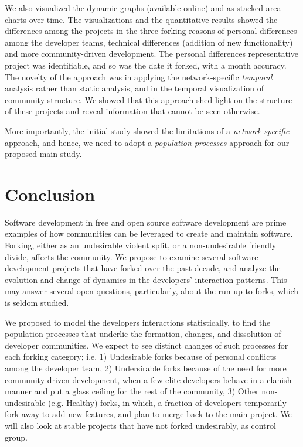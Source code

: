 \documentclass{acm_proc_article-sp}
\begin{document}
We also visualized the dynamic graphs (available online) and as stacked area charts over time. The visualizations and the quantitative results showed the differences among the projects in the three forking reasons of personal differences among the developer teams, technical differences (addition of new functionality) and more community-driven development. The personal differences representative project was identifiable, and so was the date it forked, with a month accuracy. The novelty of the approach was in applying the network-specific \textit{temporal} analysis rather than static analysis, and in the temporal visualization of community structure. We showed that this approach shed light on the structure of these projects and reveal information that cannot be seen otherwise.

More importantly, the initial study showed the limitations of a \textit{network-specific} approach, and hence, we need to adopt a \textit{population-processes} approach for our proposed main study.

\section{Conclusion}
Software development in free and open source software development are prime examples of how communities can be leveraged to create and maintain software. Forking, either as an undesirable violent split, or a non-undesirable friendly divide, affects the community. We propose to examine several software development projects that have forked over the past decade, and analyze the evolution and change of dynamics in the developers' interaction patterns. This may answer several open questions, particularly, about the run-up to forks, which is seldom studied.

We proposed to model the developers interactions statistically, to find the population processes that underlie the formation, changes, and dissolution of developer communities. We expect to see distinct changes of such processes for each forking category; i.e. 1) Undesirable forks because of personal conflicts among the developer team, 2) Undersirable forks because of the need for more community-driven development, when a few elite developers behave in a clanish manner and put a glass ceiling for the rest of the community, 3) Other non-undesirable (e.g. Healthy) forks, in which, a fraction of developers temporarily fork away to add new features, and plan to merge back to the main project. We will also look at stable projects that have not forked undesirably, as control group. 
\end{document}

